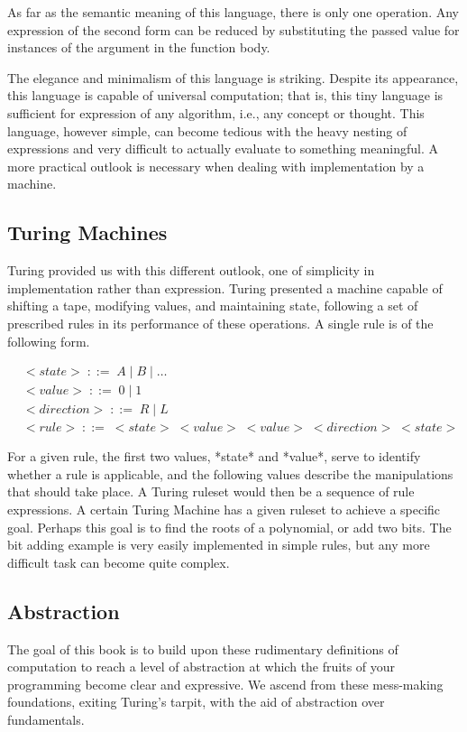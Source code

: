 \documentclass[11pt]{article}
\begin{document}
As far as the semantic meaning of this language, there is only one operation. Any expression of the second form can be reduced by substituting the passed value for instances of the argument in the function body.

The elegance and minimalism of this language is striking. Despite its appearance, this language is capable of universal computation; that is, this tiny language is sufficient for expression of any algorithm, i.e., any concept or thought. This language, however simple, can become tedious with the heavy nesting of expressions and very difficult to actually evaluate to something meaningful. A more practical outlook is necessary when dealing with implementation by a machine.

\subsection{Turing Machines}
Turing provided us with this different outlook, one of simplicity in implementation rather than expression. Turing presented a machine capable of shifting a tape, modifying values, and maintaining state, following a set of prescribed rules in its performance of these operations. A single rule is of the following form.

\begin{align*}
& <state> \; ::= \; A \; | \; B \; | \; \dots
\\& <value> \; ::= \; 0 \; | \; 1
\\& <direction> \; ::= \; R \; | \; L
\\& <rule> \; ::= \; <state> \; <value> \; <value> \; <direction> \; <state>
\end{align*}

For a given rule, the first two values, *state* and *value*, serve to identify whether a rule is applicable, and the following values describe the manipulations that should take place. A Turing ruleset would then be a sequence of rule expressions. A certain Turing Machine has a given ruleset to achieve a specific goal. Perhaps this goal is to find the roots of a polynomial, or add two bits. The bit adding example is very easily implemented in simple rules, but any more difficult task can become quite complex.

\subsection{Abstraction}
The goal of this book is to build upon these rudimentary definitions of computation to reach a level of abstraction at which the fruits of your programming become clear and expressive. We ascend from these mess-making foundations, exiting Turing's tarpit, with the aid of abstraction over fundamentals.
\end{document}

